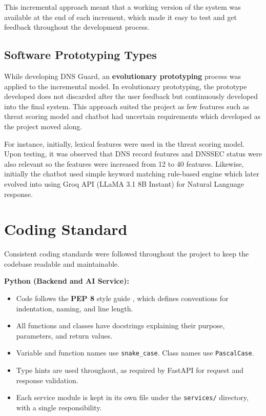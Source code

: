 \documentclass[12pt, a4paper, oneside]{report}
\begin{document}
This incremental approach meant that a working version of the system was available at the end of each increment, which made it easy to test and get feedback throughout the development process.

\subsection{Software Prototyping Types}

While developing DNS Guard, an \textbf{evolutionary prototyping} process was applied to the incremental model. In evolutionary prototyping, the prototype developed does not discarded after the user feedback but continuously developed into the final system. This approach suited the project as few features such as threat scoring model and chatbot had uncertain requirements which developed as the project moved along.

For instance, initially, lexical features were used in the threat scoring model. Upon testing, it was observed that DNS record features and DNSSEC status were also relevant so the features were increased from 12 to 40 features. Likewise, initially the chatbot used simple keyword matching rule-based engine which later evolved into using Groq API (LLaMA 3.1 8B Instant) for Natural Language response.

\section{Coding Standard}

Consistent coding standards were followed throughout the project to keep the codebase readable and maintainable.

\textbf{Python (Backend and AI Service):}
\begin{itemize}
    \item Code follows the \textbf{PEP 8} style guide \cite{pep8}, which defines conventions for indentation, naming, and line length.
    \item All functions and classes have docstrings explaining their purpose, parameters, and return values.
    \item Variable and function names use \texttt{snake\_case}. Class names use \texttt{PascalCase}.
    \item Type hints are used throughout, as required by FastAPI for request and response validation.
    \item Each service module is kept in its own file under the \texttt{services/} directory, with a single responsibility.
\end{itemize}
\end{document}

